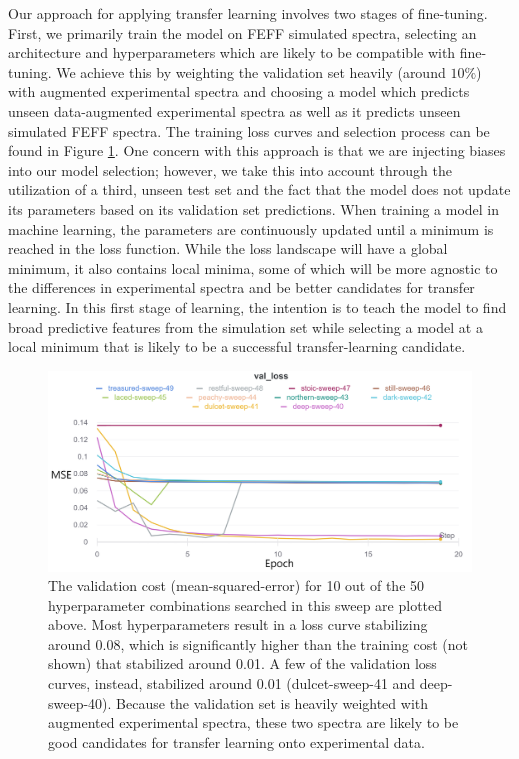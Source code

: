 \egroup


Our approach for applying transfer learning involves two stages of fine-tuning. First, we primarily train the model on FEFF simulated spectra, selecting an architecture and hyperparameters which are likely to be compatible with fine-tuning. We achieve this by weighting the validation set heavily (around $ 10\% $) with augmented experimental spectra and choosing a model which predicts unseen data-augmented experimental spectra as well as it predicts unseen simulated FEFF spectra. The training loss curves and selection process can be found in Figure \ref{fig:meta-1-sweep-loss}. One concern with this approach is that we are injecting biases into our model selection; however, we take this into account through the utilization of a third, unseen test set and the fact that the model does not update its parameters based on its validation set predictions. When training a model in machine learning, the parameters are continuously updated until a minimum is reached in the loss function. While the loss landscape will have a global minimum, it also contains local minima, some of which will be more agnostic to the differences in experimental spectra and be better candidates for transfer learning. In this first stage of learning, the intention is to teach the model to find broad predictive features from the simulation set while selecting a model at a local minimum that is likely to be a successful transfer-learning candidate. 


\begin{figure}
    \centering
    \includegraphics[width=\linewidth]{Chapters/Figures/10-sweep.png}
    \caption[Hyperparamater Sweep Cost Curve]{The validation cost (mean-squared-error) for 10 out of the 50 hyperparameter combinations searched in this sweep are plotted above. Most hyperparameters result in a loss curve stabilizing around 0.08, which is significantly higher than the training cost (not shown) that stabilized around 0.01. A few of the validation loss curves, instead, stabilized around 0.01 (dulcet-sweep-41 and deep-sweep-40). Because the validation set is heavily weighted with augmented experimental spectra, these two spectra are likely to be good candidates for transfer learning onto experimental data.}
    \label{fig:meta-1-sweep-loss}
\end{figure}

